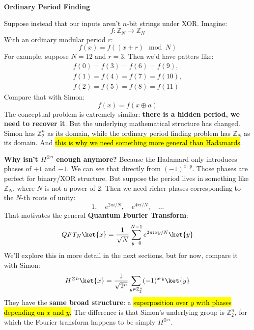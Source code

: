 \highspace
\begin{flushleft}
    \textcolor{Red2}{ \textbf{Ordinary Period Finding}}
\end{flushleft}
Suppose instead that our inputs aren't $n$-bit strings under XOR. Imagine:
\begin{equation*}
    f: \mathbb{Z}_{N} \to \mathbb{Z}_{N}
\end{equation*}
With an ordinary modular period $r$:
\begin{equation*}
    f(x) = f((x + r) \mod N)
\end{equation*}
For example, suppose $N=12$ and $r=3$. Then we'd have patters like:
\begin{gather*}
    f(0) = f(3) = f(6) = f(9),\\
    f(1) = f(4) = f(7) = f(10),\\
    f(2) = f(5) = f(8) = f(11)
\end{gather*}
Compare that with Simon:
\begin{equation*}
    f(x) = f(x \oplus a)
\end{equation*}
The conceptual problem is extremely similar: \textbf{there is a hidden period, we need to recover it}. But the underlying mathematical structure has changed. Simon has $\mathbb{Z}_{2}^n$ as its domain, while the ordinary period finding problem has $\mathbb{Z}_{N}$ as its domain. And \hl{this is why we need something more general than Hadamards}.

\highspace
\textcolor{Green3}{ \textbf{Why isn't $H^{\otimes n}$ enough anymore?}} Because the Hadamard only introduces phases of $+1$ and $-1$. We can see that directly from $(-1)^{x \cdot y}$. Those phases are perfect for binary/XOR structure. But suppose the period lives in something like $\mathbb{Z}_{N}$, where $N$ is not a power of 2. Then we need richer phases corresponding to the $N$-th roots of unity:
\begin{equation*}
    1, \quad e^{2\pi i / N}, \quad e^{4\pi i / N}, \quad \ldots
\end{equation*}
That motivates the general \textbf{Quantum Fourier Transform}:
\begin{equation*}
    QFT_{N} \ket{x} = \frac{1}{\sqrt{N}} \sum_{y=0}^{N-1} e^{2\pi i xy / N} \ket{y}
\end{equation*}
We'll explore this in more detail in the next sections, but for now, compare it with Simon:
\begin{equation*}
    H^{\otimes n} \ket{x} = \frac{1}{\sqrt{2^n}} \sum_{y \in \mathbb{Z}_2^n} (-1)^{x \cdot y} \ket{y}
\end{equation*}
They have the \textbf{same broad structure}: a \hl{superposition over $y$ with phases depending on $x$ and $y$.} The difference is that Simon's underlying group is $\mathbb Z_2^n$, for which the Fourier transform happens to be simply $H^{\otimes n}$.
